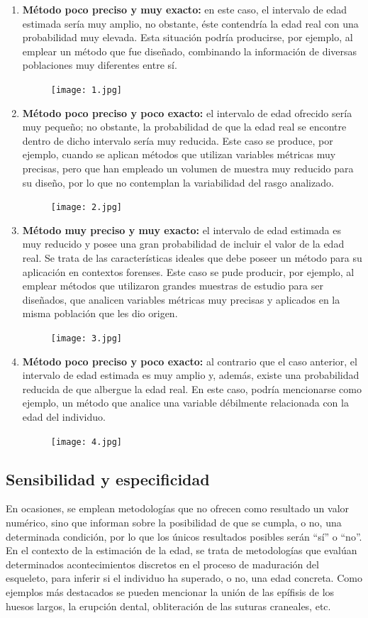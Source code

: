 \documentclass[a4paper,11pt]{article}
\begin{document}
\begin{enumerate}
\item {\bf Método poco preciso y muy exacto:} en este caso, el intervalo de edad estimada sería muy amplio, no obstante, éste contendría la edad real con una probabilidad muy elevada. Esta situación podría producirse, por ejemplo, al emplear un método que fue diseñado, combinando la información de diversas poblaciones muy diferentes entre sí.
\begin{figure}[h!]
\centering
\texttt{[image: 1.jpg]}
\end{figure}
\item {\bf Método poco preciso y poco exacto:} el intervalo de edad ofrecido sería muy pequeño; no obstante, la probabilidad de que la edad real se encontre dentro de dicho intervalo sería muy reducida. Este caso se produce, por ejemplo, cuando se aplican métodos que utilizan variables métricas muy precisas, pero que han empleado un volumen de muestra muy reducido para su diseño, por lo que no contemplan la variabilidad del rasgo analizado.
\begin{figure}[h!]
\centering
\texttt{[image: 2.jpg]}
\end{figure}
\item {\bf Método muy preciso y muy exacto:} el intervalo de edad estimada es muy reducido y posee una gran probabilidad de incluir el valor de la edad real. Se trata de las características ideales que debe poseer un método para su aplicación en contextos forenses. Este caso se pude producir, por ejemplo, al emplear métodos que utilizaron grandes muestras de estudio para ser diseñados, que analicen variables métricas muy precisas y aplicados en la misma población que les dio origen.
\begin{figure}[h!]
\centering
\texttt{[image: 3.jpg]}
\end{figure}
\item {\bf Método poco preciso y poco exacto:} al contrario que el caso anterior, el intervalo de edad estimada es muy amplio y, además, existe una probabilidad reducida de que albergue la edad real. En este caso, podría mencionarse como ejemplo, un método que analice una variable débilmente relacionada con la edad del individuo.
\begin{figure}[h!]
\centering
\texttt{[image: 4.jpg]}
\end{figure}
\end{enumerate}

\subsection{Sensibilidad y especificidad}
En ocasiones, se emplean metodologías que no ofrecen como resultado un valor numérico, sino que informan sobre la posibilidad de que se cumpla, o no, una determinada condición, por lo que los únicos resultados posibles serán “sí” o “no”. En el contexto de la estimación de la edad, se trata de metodologías que evalúan determinados acontecimientos discretos en el proceso de maduración del esqueleto, para inferir si el individuo ha superado, o no, una edad concreta. Como ejemplos más destacados se pueden mencionar la unión de las epífisis de los huesos largos, la erupción dental, obliteración de las suturas craneales, etc.
\end{document}
